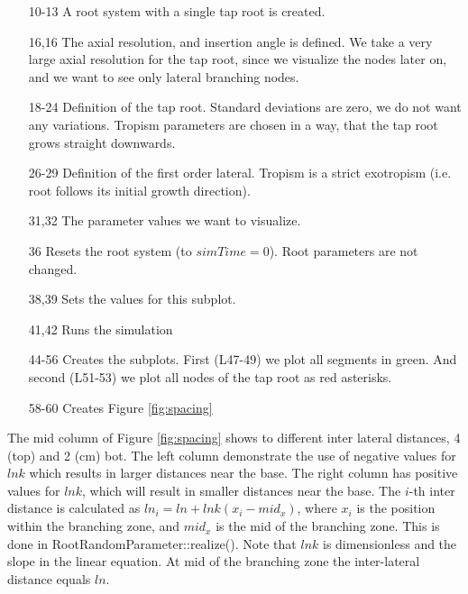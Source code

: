 

\begin{itemize}
\item[10-13] A root system with a single tap root is created. 
\item[16,16] The axial resolution, and insertion angle is defined. We take a very large axial resolution for the tap root, since we visualize the nodes later on, and we want to see only lateral branching nodes.
\item[18-24] Definition of the tap root. Standard deviations are zero, we do not want any variations. Tropism parameters are chosen in a way, that the tap root grows straight downwards.
\item[26-29] Definition of the first order lateral. Tropism is a strict exotropism (i.e. root follows its initial growth direction).
\item[31,32] The parameter values we want to visualize.
\item[36] Resets the root system (to $simTime = 0$). Root parameters are not changed. 
\item[38,39] Sets the values for this subplot. 
\item[41,42] Runs the simulation
\item[44-56] Creates the subplots. First (L47-49) we plot all segments in green. And second (L51-53) we plot all nodes of the tap root as red asterisks.
\item[58-60] Creates Figure \ref{fig:spacing}
\end{itemize}

The mid column of Figure \ref{fig:spacing} shows to different inter lateral distances, 4 (top) and 2 (cm) bot. The left column demonstrate the use of negative values for $lnk$ which results in larger distances near the base. The right column has positive values for $lnk$, which will result in smaller distances near the base. The $i$-th inter distance is calculated as $ln_i = ln + lnk (x_i-mid_x)$, where $x_i$ is the position within the branching zone, and $mid_x$ is the mid of the branching zone. This is done in RootRandomParameter::realize(). Note that $lnk$ is dimensionless and the slope in the linear equation. At mid of the branching zone the inter-lateral distance equals $ln$. 


